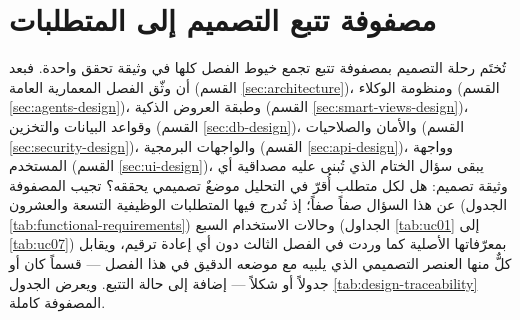 %
\section{مصفوفة تتبع التصميم إلى المتطلبات}
\label{sec:design-traceability}

تُختَم رحلة التصميم بمصفوفة تتبع تجمع خيوط الفصل كلها في وثيقة تحقق واحدة. فبعد أن وثّق الفصل المعمارية العامة (القسم \ref{sec:architecture})، ومنظومة الوكلاء (القسم \ref{sec:agents-design})، وطبقة العروض الذكية (القسم \ref{sec:smart-views-design})، وقواعد البيانات والتخزين (القسم \ref{sec:db-design})، والأمان والصلاحيات (القسم \ref{sec:security-design})، والواجهات البرمجية (القسم \ref{sec:api-design})، وواجهة المستخدم (القسم \ref{sec:ui-design})، يبقى سؤال الختام الذي تُبنى عليه مصداقية أي وثيقة تصميم: هل لكل متطلب أُقرّ في التحليل موضعٌ تصميمي يحققه؟ تجيب المصفوفة عن هذا السؤال صفاً صفاً؛ إذ تُدرج فيها المتطلبات الوظيفية التسعة والعشرون (الجدول \ref{tab:functional-requirements}) وحالات الاستخدام السبع (الجداول \ref{tab:uc01} إلى \ref{tab:uc07}) بمعرّفاتها الأصلية كما وردت في الفصل الثالث دون أي إعادة ترقيم، ويقابل كلٌّ منها العنصر التصميمي الذي يلبيه مع موضعه الدقيق في هذا الفصل — قسماً كان أو جدولاً أو شكلاً — إضافة إلى حالة التتبع. ويعرض الجدول \ref{tab:design-traceability} المصفوفة كاملة.

